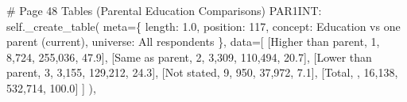 \documentclass[
  11pt,
  a4paper,
]{article}
\newenvironment{Shaded}{\begin{snugshade}}{\end{snugshade}}
\newcommand{\CommentTok}[1]{\textcolor[rgb]{0.37,0.37,0.37}{#1}}
\newcommand{\NormalTok}[1]{\textcolor[rgb]{0.00,0.23,0.31}{#1}}
\newcommand{\OperatorTok}[1]{\textcolor[rgb]{0.37,0.37,0.37}{#1}}
\newcommand{\StringTok}[1]{\textcolor[rgb]{0.13,0.47,0.30}{#1}}
\newcommand{\VariableTok}[1]{\textcolor[rgb]{0.07,0.07,0.07}{#1}}
\begin{document}
\begin{Shaded}
\begin{Highlighting}[]
    \CommentTok{\# Page 48 Tables (Parental Education Comparisons)}
    \StringTok{\textquotesingle{}PAR1INT\textquotesingle{}}\NormalTok{: }\VariableTok{self}\NormalTok{.\_create\_table(}
\NormalTok{        meta}\OperatorTok{=}\NormalTok{\{}
            \StringTok{\textquotesingle{}length\textquotesingle{}}\NormalTok{: }\StringTok{\textquotesingle{}1.0\textquotesingle{}}\NormalTok{, }\StringTok{\textquotesingle{}position\textquotesingle{}}\NormalTok{: }\StringTok{\textquotesingle{}117\textquotesingle{}}\NormalTok{,}
            \StringTok{\textquotesingle{}concept\textquotesingle{}}\NormalTok{: }\StringTok{\textquotesingle{}Education vs one parent (current)\textquotesingle{}}\NormalTok{,}
            \StringTok{\textquotesingle{}universe\textquotesingle{}}\NormalTok{: }\StringTok{\textquotesingle{}All respondents\textquotesingle{}}
\NormalTok{        \},}
\NormalTok{        data}\OperatorTok{=}\NormalTok{[}
\NormalTok{            [}\StringTok{\textquotesingle{}Higher than parent\textquotesingle{}}\NormalTok{, }\StringTok{\textquotesingle{}1\textquotesingle{}}\NormalTok{, }\StringTok{\textquotesingle{}8,724\textquotesingle{}}\NormalTok{, }\StringTok{\textquotesingle{}255,036\textquotesingle{}}\NormalTok{, }\StringTok{\textquotesingle{}47.9\textquotesingle{}}\NormalTok{],}
\NormalTok{            [}\StringTok{\textquotesingle{}Same as parent\textquotesingle{}}\NormalTok{, }\StringTok{\textquotesingle{}2\textquotesingle{}}\NormalTok{, }\StringTok{\textquotesingle{}3,309\textquotesingle{}}\NormalTok{, }\StringTok{\textquotesingle{}110,494\textquotesingle{}}\NormalTok{, }\StringTok{\textquotesingle{}20.7\textquotesingle{}}\NormalTok{],}
\NormalTok{            [}\StringTok{\textquotesingle{}Lower than parent\textquotesingle{}}\NormalTok{, }\StringTok{\textquotesingle{}3\textquotesingle{}}\NormalTok{, }\StringTok{\textquotesingle{}3,155\textquotesingle{}}\NormalTok{, }\StringTok{\textquotesingle{}129,212\textquotesingle{}}\NormalTok{, }\StringTok{\textquotesingle{}24.3\textquotesingle{}}\NormalTok{],}
\NormalTok{            [}\StringTok{\textquotesingle{}Not stated\textquotesingle{}}\NormalTok{, }\StringTok{\textquotesingle{}9\textquotesingle{}}\NormalTok{, }\StringTok{\textquotesingle{}950\textquotesingle{}}\NormalTok{, }\StringTok{\textquotesingle{}37,972\textquotesingle{}}\NormalTok{, }\StringTok{\textquotesingle{}7.1\textquotesingle{}}\NormalTok{],}
\NormalTok{            [}\StringTok{\textquotesingle{}Total\textquotesingle{}}\NormalTok{, }\StringTok{\textquotesingle{}\textquotesingle{}}\NormalTok{, }\StringTok{\textquotesingle{}16,138\textquotesingle{}}\NormalTok{, }\StringTok{\textquotesingle{}532,714\textquotesingle{}}\NormalTok{, }\StringTok{\textquotesingle{}100.0\textquotesingle{}}\NormalTok{]}
\NormalTok{        ]}
\NormalTok{    ),}


\end{Highlighting}
\end{Shaded}
\end{document}
